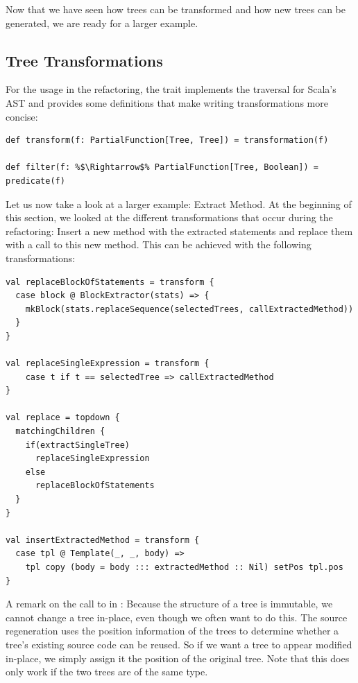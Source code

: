 Now that we have seen how trees can be transformed and how new trees can be generated, we are ready for a larger example.

\subsection{Tree Transformations}\label{subsection:tree-transformations}

For the usage in the refactoring, the  trait implements the traversal for Scala's AST and provides some definitions that make writing transformations more concise:

\begin{lstlisting}
def transform(f: PartialFunction[Tree, Tree]) = transformation(f)
  
def filter(f: %$\Rightarrow$% PartialFunction[Tree, Boolean]) = predicate(f)
\end{lstlisting}

Let us now take a look at a larger example: Extract Method. At the beginning of this section, we looked at the different transformations that occur during the refactoring: Insert a new method with the extracted statements and replace them with a call to this new method. This can be achieved with the following transformations:

\begin{lstlisting}
val replaceBlockOfStatements = transform {
  case block @ BlockExtractor(stats) => {
    mkBlock(stats.replaceSequence(selectedTrees, callExtractedMethod))
  }
}

val replaceSingleExpression = transform {
    case t if t == selectedTree => callExtractedMethod
}

val replace = topdown {
  matchingChildren {
    if(extractSingleTree)
      replaceSingleExpression
    else
      replaceBlockOfStatements
  }
}

val insertExtractedMethod = transform {
  case tpl @ Template(_, _, body) => 
    tpl copy (body = body ::: extractedMethod :: Nil) setPos tpl.pos
}
\end{lstlisting}

A remark on the call to  in : Because the structure of a tree is immutable, we cannot change a tree in-place, even though we often want to do this. The source regeneration uses the position information of the trees to determine whether a tree's existing source code can be reused. So if we want a tree to appear modified in-place, we simply assign it the position of the original tree. Note that this does only work if the two trees are of the same type.

